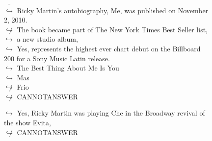 \documentclass[11pt,a4paper, onecolumn]{article}
\begin{document}
\begin{figure}[t] \small \begin{tcolorbox}[boxsep=0pt,left=5pt,right=0pt,top=2pt,colback = yellow!5] \begin{dialogue}
 \small 
\colorbox{pink!25}{ $\bar{\hookrightarrow}$}
{ Ricky Martin's autobiography, Me, was published on November 2, 2010. }
\\
\colorbox{pink!25}{$\not\hookrightarrow$}
{ The book became part of The New York Times Best Seller list, }
\\
\colorbox{pink!25}{$\hookrightarrow$}
{ a new studio album, }
\\
\colorbox{pink!25}{$\hookrightarrow$}
\colorbox{red!25}{Yes,}
{ represents the highest ever chart debut on the Billboard 200 for a Sony Music Latin release. }
\\
\colorbox{pink!25}{$\hookrightarrow$}
{ The Best Thing About Me Is You }
\\
\colorbox{pink!25}{$\hookrightarrow$}
{ Mas }
\\
\colorbox{pink!25}{$\not\hookrightarrow$}
{ Frio }
\\
\colorbox{pink!25}{$\not\hookrightarrow$}
{ CANNOTANSWER }
 \end{dialogue}\end{tcolorbox}\end{figure}\begin{figure}[t] \small \begin{tcolorbox}[boxsep=0pt,left=5pt,right=0pt,top=2pt,colback = yellow!5] \begin{dialogue}
 \small 
\colorbox{pink!25}{$\hookrightarrow$}
\colorbox{red!25}{Yes,}
{ Ricky Martin was playing Che in the Broadway revival of the show Evita, }
\\
\colorbox{pink!25}{$\not\hookrightarrow$}
{ CANNOTANSWER }
\\
 \end{dialogue}\end{tcolorbox}\end{figure}
\end{document}
